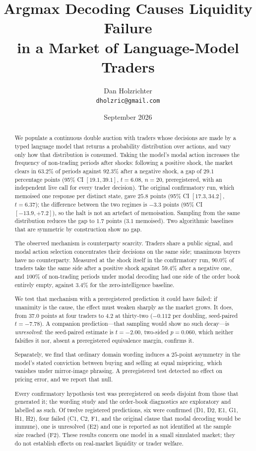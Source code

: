 \documentclass[11pt]{article}
\title{Argmax Decoding Causes Liquidity Failure\\
in a Market of Language-Model Traders}
\author{%
  Dan Holzrichter\\
  \texttt{dholzric@gmail.com}
}
\date{September 2026}
\begin{document}
\maketitle

\begin{abstract}
We populate a continuous double auction with traders whose decisions are made
by a typed language model that returns a probability distribution over actions,
and vary only how that distribution is consumed. Taking the model's modal
action increases the frequency of non-trading periods after
shocks: following a positive shock, the market clears in $63.2\%$ of periods
against $92.3\%$ after a negative shock, a gap of $29.1$ percentage points
(95\% CI $[19.1, 39.1]$, $t=6.08$, $n=20$, preregistered, with an independent
live call for every trader decision). The original confirmatory run, which
memoised one response per distinct state, gave $25.8$ points (95\% CI
$[17.3, 34.2]$, $t=6.37$); the difference between the two regimes is $-3.3$
points (95\% CI $[-13.9, +7.2]$), so the halt is not an artefact of
memoisation. Sampling from the same distribution reduces the gap to $1.7$
points ($3.1$ memoised). Two algorithmic baselines that are symmetric by
construction show no gap.

The observed mechanism is counterparty scarcity. Traders share a public
signal, and modal action selection concentrates their decisions on the same
side; unanimous buyers have no counterparty. Measured at the shock itself in the
confirmatory run, $90.0\%$ of traders take the same side after a positive
shock against $59.4\%$ after a negative one, and $100\%$ of non-trading periods
under modal decoding had one side of the order book entirely empty, against
$3.4\%$ for the zero-intelligence baseline.

We test that mechanism with a preregistered prediction it could have failed: if
unanimity is the cause, the effect must weaken sharply as the market grows.
It does,
from $37.0$ points at four traders to $4.2$ at thirty-two ($-0.112$ per
doubling, seed-paired $t=-7.78$). A companion prediction---that sampling would
show no such decay---is \emph{unresolved}: the seed-paired estimate is
$t=-2.00$, two-sided $p=0.060$, which neither falsifies it nor, absent a
preregistered equivalence margin, confirms it.

Separately, we find that ordinary domain wording induces a $25$-point
asymmetry in the model's stated conviction between buying and selling at equal
mispricing, which vanishes under mirror-image phrasing. A preregistered test
detected no effect on pricing error, and we report that null.

Every confirmatory hypothesis test was preregistered on seeds disjoint from
those that generated it; the wording study and the order-book diagnostics are
exploratory and labelled as such. Of twelve registered predictions, six were
confirmed (D1, D2, E1, G1, H1, H2), four failed (C1, C2, F1, and the original
clause that modal decoding would be immune), one is unresolved (E2) and one is
reported as not identified at the sample size reached (F2). These results
concern one model in a small simulated market; they do not establish effects
on real-market liquidity or trader welfare.
\end{abstract}
\end{document}
